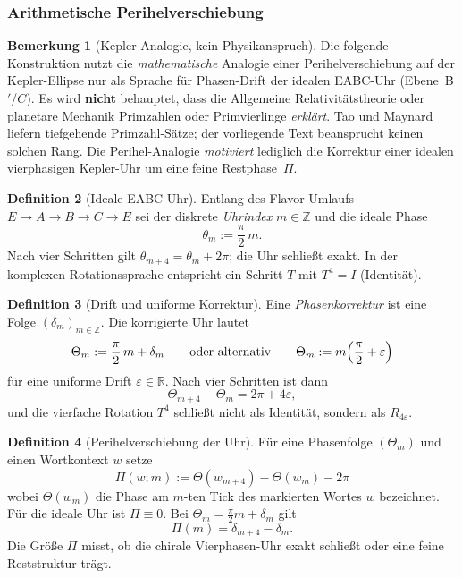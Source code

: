 \documentclass[11pt,a4paper]{article}
\theoremstyle{definition}
\newtheorem{definition}{Definition}[section]
\newtheorem{bemerkung}[definition]{Bemerkung}
\theoremstyle{plain}
\newcommand{\Z}{\mathbb{Z}}
\newcommand{\R}{\mathbb{R}}
\begin{document}
	\subsubsection{Arithmetische Perihelverschiebung}\label{subsec:perihel-drift}
	
	\begin{bemerkung}[Kepler-Analogie, kein Physikanspruch]
		Die folgende Konstruktion nutzt die \emph{mathematische} Analogie einer Perihelverschiebung auf der Kepler-Ellipse nur als Sprache für Phasen-Drift der idealen EABC-Uhr (Ebene~B$'$/$C$). Es wird \textbf{nicht} behauptet, dass die Allgemeine Relativitätstheorie oder planetare Mechanik Primzahlen oder Primvierlinge \emph{erklärt}. Tao und Maynard liefern tiefgehende Primzahl-Sätze; der vorliegende Text beansprucht keinen solchen Rang. Die Perihel-Analogie \emph{motiviert} lediglich die Korrektur einer idealen vierphasigen Kepler-Uhr um eine feine Restphase~$\Pi$.
	\end{bemerkung}
	
	\begin{definition}[Ideale EABC-Uhr]
		Entlang des Flavor-Umlaufs $E\to A\to B\to C\to E$ sei der diskrete \emph{Uhrindex} $m\in\Z$ und die ideale Phase
		\[
		\theta_m := \frac{\pi}{2}\,m.
		\]
		Nach vier Schritten gilt $\theta_{m+4}=\theta_m+2\pi$; die Uhr schließt exakt. In der komplexen Rotationssprache entspricht ein Schritt $T$ mit $T^4=I$ (Identität).
	\end{definition}
	
	\begin{definition}[Drift und uniforme Korrektur]
		Eine \emph{Phasenkorrektur} ist eine Folge $(\delta_m)_{m\in\Z}$. Die korrigierte Uhr lautet
		\[
		\Theta_m := \frac{\pi}{2}\,m + \delta_m
		\qquad\text{oder alternativ}\qquad
		\Theta_m := m\Bigl(\frac{\pi}{2}+\varepsilon\Bigr)
		\]
		für eine uniforme Drift $\varepsilon\in\R$. Nach vier Schritten ist dann
		\[
		\Theta_{m+4}-\Theta_m = 2\pi + 4\varepsilon,
		\]
		und die vierfache Rotation $T^4$ schließt nicht als Identität, sondern als $R_{4\varepsilon}$.
	\end{definition}
	
	\begin{definition}[Perihelverschiebung der Uhr]\label{def:perihel-shift}
		Für eine Phasenfolge $(\Theta_m)$ und einen Wortkontext $w$ setze
		\[
		\boxed{\;\Pi(w;m):=\Theta(w_{m+4})-\Theta(w_m)-2\pi\;}
		\]
		wobei $\Theta(w_m)$ die Phase am $m$-ten Tick des markierten Wortes $w$ bezeichnet. Für die ideale Uhr ist $\Pi\equiv 0$. Bei $\Theta_m=\tfrac{\pi}{2}m+\delta_m$ gilt
		\[
		\Pi(m)=\delta_{m+4}-\delta_m.
		\]
		Die Größe $\Pi$ misst, ob die chirale Vierphasen-Uhr exakt schließt oder eine feine Reststruktur trägt.
	\end{definition}
	
\end{document}

